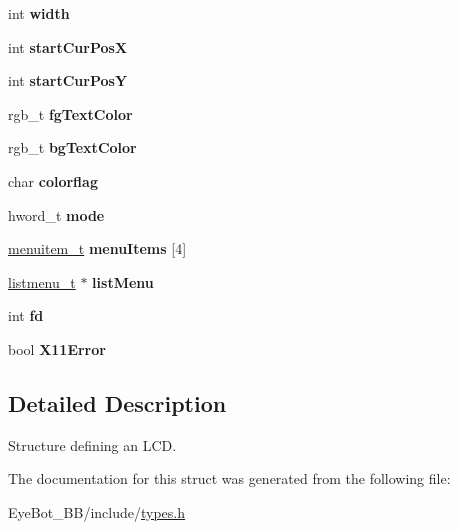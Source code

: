 \begin{DoxyCompactItemize}
\item 
\hypertarget{struct_l_c_d_handle_a6842a22f488a36687f6bc3cebd7ee7bb}{int {\bfseries width}}\label{struct_l_c_d_handle_a6842a22f488a36687f6bc3cebd7ee7bb}

\item 
\hypertarget{struct_l_c_d_handle_abe563b0555331ed093bd0b26cc8999b8}{int {\bfseries start\-Cur\-Pos\-X}}\label{struct_l_c_d_handle_abe563b0555331ed093bd0b26cc8999b8}

\item 
\hypertarget{struct_l_c_d_handle_aecee908fa0fc52449d5cea03af9edd7f}{int {\bfseries start\-Cur\-Pos\-Y}}\label{struct_l_c_d_handle_aecee908fa0fc52449d5cea03af9edd7f}

\item 
\hypertarget{struct_l_c_d_handle_a51eb743010d46c2b88cf57f4fb03d90b}{rgb\-\_\-t {\bfseries fg\-Text\-Color}}\label{struct_l_c_d_handle_a51eb743010d46c2b88cf57f4fb03d90b}

\item 
\hypertarget{struct_l_c_d_handle_aae7e5f763b685f6cf9aae723b98e16b9}{rgb\-\_\-t {\bfseries bg\-Text\-Color}}\label{struct_l_c_d_handle_aae7e5f763b685f6cf9aae723b98e16b9}

\item 
\hypertarget{struct_l_c_d_handle_ae12a3d787a813e51d4cefb55aa233cc8}{char {\bfseries colorflag}}\label{struct_l_c_d_handle_ae12a3d787a813e51d4cefb55aa233cc8}

\item 
\hypertarget{struct_l_c_d_handle_aecd70593880449256ec96e13ac98a7c6}{hword\-\_\-t {\bfseries mode}}\label{struct_l_c_d_handle_aecd70593880449256ec96e13ac98a7c6}

\item 
\hypertarget{struct_l_c_d_handle_acc2000d2c33be3186b5d878fd300b2b7}{\hyperlink{structmenuitem__t}{menuitem\-\_\-t} {\bfseries menu\-Items} \mbox{[}4\mbox{]}}\label{struct_l_c_d_handle_acc2000d2c33be3186b5d878fd300b2b7}

\item 
\hypertarget{struct_l_c_d_handle_ae90a87b5cf9940b609d778954b1f1493}{\hyperlink{structlistmenu__t}{listmenu\-\_\-t} $\ast$ {\bfseries list\-Menu}}\label{struct_l_c_d_handle_ae90a87b5cf9940b609d778954b1f1493}

\item 
\hypertarget{struct_l_c_d_handle_af11a6b1e9fb680eb334445a6f8bb7edf}{int {\bfseries fd}}\label{struct_l_c_d_handle_af11a6b1e9fb680eb334445a6f8bb7edf}

\item 
\hypertarget{struct_l_c_d_handle_ab38f88c993083446ad156fa3bc9ccdcc}{bool {\bfseries \-X11\-Error}}\label{struct_l_c_d_handle_ab38f88c993083446ad156fa3bc9ccdcc}

\end{DoxyCompactItemize}


\subsection{\-Detailed \-Description}
\-Structure defining an \-L\-C\-D. 

\-The documentation for this struct was generated from the following file\-:\begin{DoxyCompactItemize}
\item 
\-Eye\-Bot\-\_\-\-B\-B/include/\hyperlink{types_8h}{types.\-h}\end{DoxyCompactItemize}
